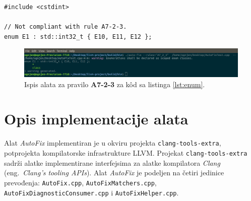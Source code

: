 \documentclass[12pt,oneside]{memoir}
\begin{document}
\begin{lstlisting}[style=customc, caption={Primer koda koji nije napisan u skladu sa pravilom \textbf{A7-2-3}, odnosno ne koristi sintaksu \texttt{enum class}.}, label=lst:enum]
#include <cstdint>

// Not compliant with rule A7-2-3.
enum E1 : std::int32_t { E10, E11, E12 };

\end{lstlisting}


\begin{figure}[!h]
\begin{center}
\includegraphics[scale=0.3]{A7_2_3.png}
\end{center}
\caption{Ispis alata za pravilo \textbf{A7-2-3} za k\^{o}d sa listinga \ref{lst:enum}.}
\label{fig:A7-2-3}
\end{figure}

\section{Opis implementacije alata}

Alat \textit{AutoFix} implementiran je u okviru projekta \texttt{clang-tools-extra}, potprojekta kompilatorske infrastrukture LLVM. Projekat \texttt{clang-tools-extra} sadr\v{z}i alatke implementirane interfejsima za alatke kompilatora \textit{Clang} (eng.~\textit{Clang’s tooling APIs}).
Alat \textit{AutoFix} je podeljen na \v{c}etiri jedinice prevođenja: \texttt{AutoFix.cpp}, \texttt{AutoFix\-Matchers.cpp}, \texttt{AutoFixDiagnosticConsumer.cpp} i \texttt{AutoFixHelper.cpp}.
\end{document}
